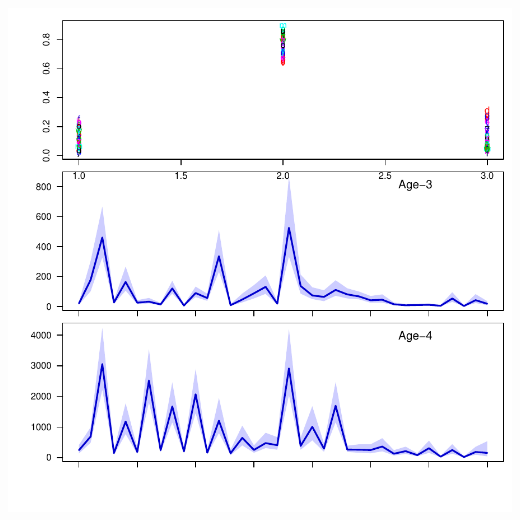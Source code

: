 \documentclass[11pt,]{article}
\begin{document}
\includegraphics{App_3_Summarize_results_files/figure-latex/plot_recruits_by_age-1.pdf}
\end{document}
